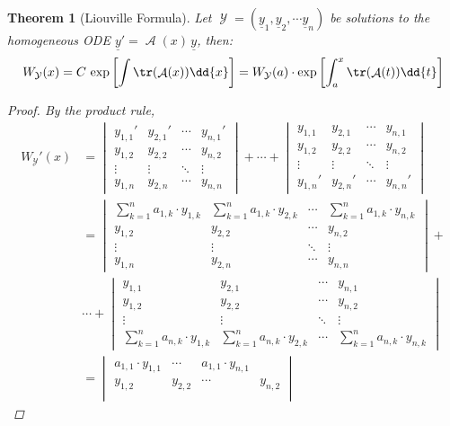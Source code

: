 \documentclass[12pt]{article}
\DeclareMathOperator{\A}{\mathcal{A}}
\DeclareMathOperator{\Y}{\mathcal{Y}}
\newcommand{\tuple}[1]{\underline{#1}}
\newtheorem{theorem}{Theorem}[subsection]
\begin{document}
\begin{theorem}[Liouville Formula]
  Let $\Y=(\tuple{y}_1,\tuple{y}_2,\cdots \tuple{y}_n)$ be solutions to the homogeneous ODE $\tuple{y}'=\A(x)\,\tuple{y}$, then: $$W_{\Y}(x)=C\,\exp\left[\int\tr(\A(x))\dd{x}\right]=W_{\Y}(a)\cdot\exp\left[\int_a^x \tr(\A(t))\dd{t}\right]$$
  \begin{proof}
    By the product rule, 
    \begin{align*}
      W_{\Y}'(x)&=\begin{vmatrix}
        y_{1,1}'&y_{2,1}'&\cdots&y_{n,1}'\\
        y_{1,2}&y_{2,2}&\cdots&y_{n,2}\\
        \vdots&\vdots&\ddots&\vdots\\
        y_{1,n}&y_{2,n}&\cdots&y_{n,n}
      \end{vmatrix}+\cdots+\begin{vmatrix}
        y_{1,1}&y_{2,1}&\cdots&y_{n,1}\\
        y_{1,2}&y_{2,2}&\cdots&y_{n,2}\\
        \vdots&\vdots&\ddots&\vdots\\
        y_{1,n}'&y_{2,n}'&\cdots&y_{n,n}'
      \end{vmatrix}\\
      &=\begin{vmatrix}
        \sum_{k=1}^n a_{1,k}\cdot y_{1,k}&\sum_{k=1}^n a_{1,k}\cdot y_{2,k}&\cdots&\sum_{k=1}^n a_{1,k}\cdot y_{n,k}\\
        y_{1,2}&y_{2,2}&\cdots&y_{n,2}\\
        \vdots&\vdots&\ddots&\vdots\\
        y_{1,n}&y_{2,n}&\cdots&y_{n,n}
      \end{vmatrix}+\\
      &\cdots+\begin{vmatrix}
        y_{1,1}&y_{2,1}&\cdots&y_{n,1}\\
        y_{1,2}&y_{2,2}&\cdots&y_{n,2}\\
        \vdots&\vdots&\ddots&\vdots\\
        \sum_{k=1}^n a_{n,k}\cdot y_{1,k}&\sum_{k=1}^n a_{n,k}\cdot y_{2,k}&\cdots&\sum_{k=1}^n a_{n,k}\cdot y_{n,k}
      \end{vmatrix}\\
      &=\begin{vmatrix}
        a_{1,1}\cdot y_{1,1}&\cdots&a_{1,1}\cdot y_{n,1}\\
        y_{1,2}&y_{2,2}&\cdots&y_{n,2}\\

\end{vmatrix}
\end{align*}
\end{proof}
\end{theorem}
\end{document}
